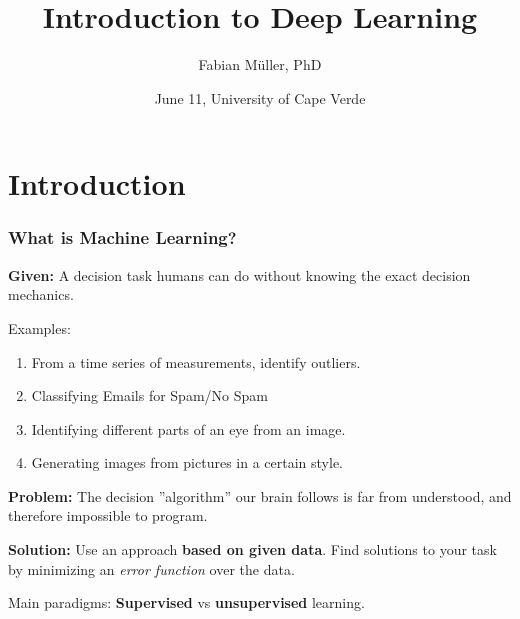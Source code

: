 \documentclass[10pt,hyperref={pdfpagelabels=false}]{beamer}
\title%
{Introduction to Deep Learning}
\author[ Fabian M\"uller]{Fabian M\"uller, PhD}
\institute{Ziemer Ophthalmic Systems in Bienne, Switzerland}
\date{June 11\nth 2019, University of Cape Verde}
\begin{document}
\frame[t,plain]{\titlepage}


\section{Introduction}
\begin{frame}
    \frametitle{What is Machine Learning?}
    \begin{itemize}
        \item {\bf Given:} A decision task humans can do without knowing the exact decision mechanics.
        {\small
        \item Examples:
            \begin{enumerate}
                \item From a time series of measurements, identify outliers.
                \item Classifying Emails for Spam/No Spam
                \item Identifying different parts of an eye from an image.
                \item Generating images from pictures in a certain style.
            \end{enumerate}
        }
        \item {\bf Problem:} The decision ''algorithm'' our brain follows is far from understood, and therefore impossible to program.
        \item {\bf Solution:} Use an approach {\bf based on given data}. Find solutions to your task by minimizing an \emph{error function} over the data.
        \item Main paradigms: {\bf Supervised} vs {\bf unsupervised} learning.
    \end{itemize}
\end{frame}
\end{document}
